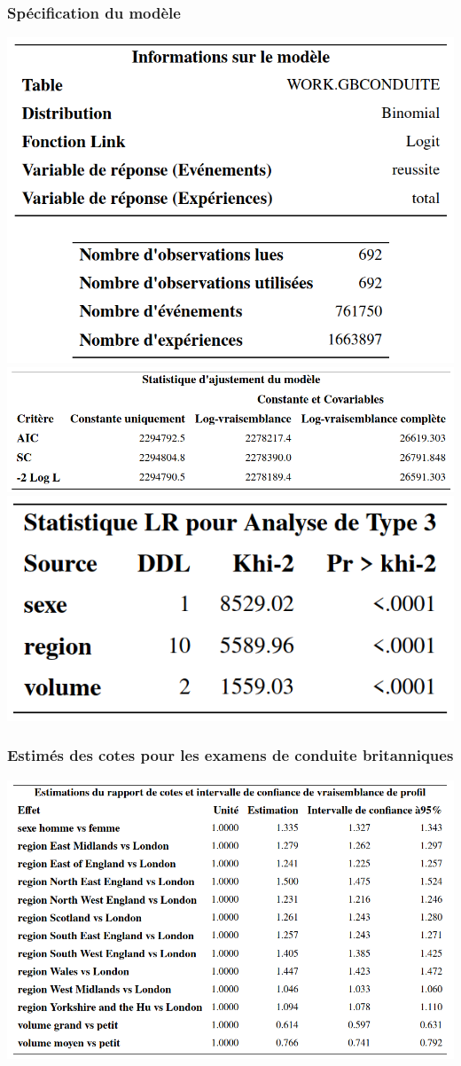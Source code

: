 \documentclass{beamer}
\begin{document}
\begin{frame}
 \frametitle{Spécification du modèle}
 \begin{center}
 \includegraphics[width = 0.48\linewidth]{img/c4/diapos8-e19}
  \includegraphics[width = 0.75\linewidth]{img/c4/diapos8-e20}
  \includegraphics[width = 0.35\linewidth]{img/c4/diapos8-e21}
 \end{center}

\end{frame}

\begin{frame}
 \frametitle{Estimés des cotes pour les examens de conduite britanniques}
 \begin{center}
 \includegraphics[width = 0.9\linewidth]{img/c4/diapos8-e22}
 \end{center}
\end{frame}
\end{document}
